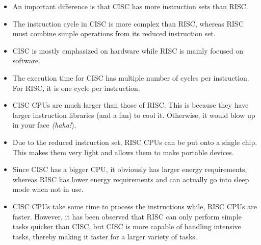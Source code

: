 \documentclass[conference]{IEEEtran}
\begin{document}
\begin{itemize}
This \verb|NOP| operation actually does nothing. It’s there so that when you finally did branch somewhere else, that last instruction was already hot on the heels of the jump instruction, so it doesn’t affect the outcome of the program. In fact , they said that you could actually optimise it in the sense that you could have the jump instruction first and because you knew the next instruction was coming up behind it, it could be the last instruction that you wanted to happen before the jump instruction, so you wrote \verb|JUMP| first, then the last instruction, both of which would get executed and this is why it was called delayed jump.
\begin{center}
OPTIMISED DELAYED JUMP
\\\verb|200 LOAD X,A|
\\\verb|201 JUMP 205|
\\\verb|202 ADD 1,A|
\\\verb|203 ADD A,B|
\\\verb|204 SUB C,B|
\\\verb|205 STORE A,Z|
\end{center}

This work in delayed jump led to one of the big differences between RISC and CISC.

It is a common misconception that CISC is always used with Von Neumann whereas RISC is used with Harvard architecture. However, there is no correlation between Instruction Set (RISC and CISC) with architecture of the processor (Harvard Architecture and Von Neumann Architecture). Both instruction set can be used with any of the architecture.

\item An important difference is that CISC has more instruction sets than RISC.
\item The instruction cycle in CISC is more complex than RISC, whereas RISC must combine simple operations from its reduced instruction set.
\item CISC is mostly emphasized on hardware while RISC is mainly focused on software.
\item The execution time for CISC has multiple number of cycles per instruction. For RISC, it is one cycle per instruction.
\item CISC CPUs are much larger than those of RISC. This is because they have larger instruction libraries (and a fan) to cool it. Otherwise, it would blow up in your face \textit{(haha!}).
\item Due to the reduced instruction set, RISC CPUs can be put onto a single chip. This makes them very light and allows them to make portable devices. \item Since CISC has a bigger CPU, it obviously has larger energy requirements, whereas RISC has lower energy requirements and can actually go into sleep mode when not in use.
\item CISC CPUs take some time to process the instructions while, RISC CPUs are faster. However, it has been observed that RISC can only perform simple tasks quicker than CISC, but CISC is more capable of handling intensive tasks, thereby making it faster for a larger variety of tasks. 
\end{itemize}
\end{document}
